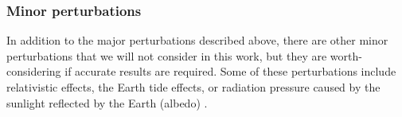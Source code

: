 \documentclass[../main.tex]{subfiles}
\begin{document}
\subsubsection{Minor perturbations}
In addition to the major perturbations described above, there are other minor perturbations that we will not consider in this work, but they are worth-considering if accurate results are required. Some of these perturbations include relativistic effects, the Earth tide effects, or radiation pressure caused by the sunlight reflected by the Earth (albedo) \cite{montenbruck}.
\end{document}
